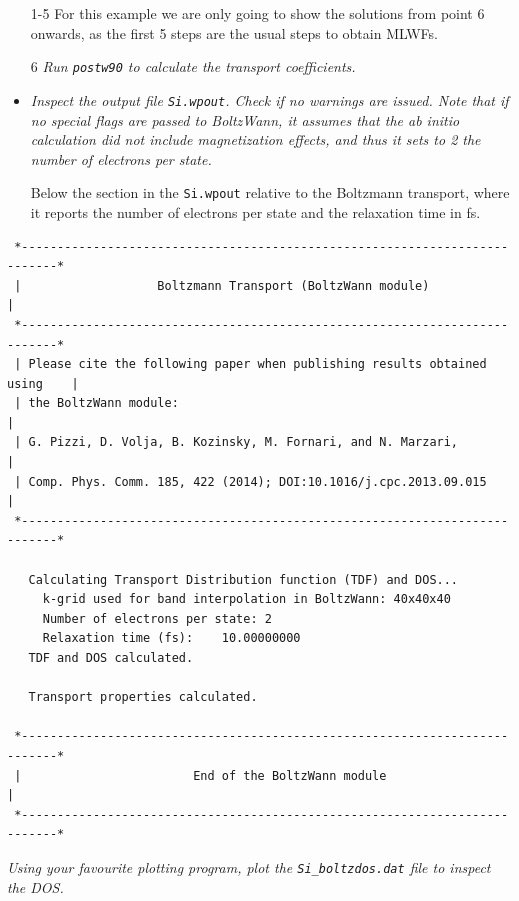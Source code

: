 \begin{itemize}
	\item[1-5] For this example we are only going to show the solutions from point 6 onwards, as the first 5 steps are the usual steps to obtain MLWFs.
	\item[6] {\it Run {\tt postw90} to calculate the transport coefficients.}
	\item {\it Inspect the output file {\tt Si.wpout}. Check if no warnings are issued. Note that if no special flags are passed to {\sc BoltzWann}, it assumes that the {\it ab initio} calculation did not include magnetization effects, and thus it sets to 2 the number of electrons per state.}

Below the section in the {\tt Si.wpout} relative to the Boltzmann transport, where it reports the number of electrons per state and the relaxation time in fs.
\end{itemize}
\begin{tcolorbox}[sharp corners,boxrule=0.5pt]
{\small
\begin{verbatim}
 *---------------------------------------------------------------------------*
 |                   Boltzmann Transport (BoltzWann module)                  |
 *---------------------------------------------------------------------------*
 | Please cite the following paper when publishing results obtained using    |
 | the BoltzWann module:                                                     |
 | G. Pizzi, D. Volja, B. Kozinsky, M. Fornari, and N. Marzari,              |
 | Comp. Phys. Comm. 185, 422 (2014); DOI:10.1016/j.cpc.2013.09.015          |
 *---------------------------------------------------------------------------*

   Calculating Transport Distribution function (TDF) and DOS...
     k-grid used for band interpolation in BoltzWann: 40x40x40
     Number of electrons per state: 2
     Relaxation time (fs):    10.00000000     
   TDF and DOS calculated.

   Transport properties calculated.

 *---------------------------------------------------------------------------*
 |                        End of the BoltzWann module                        |
 *---------------------------------------------------------------------------*
\end{verbatim}
}
\end{tcolorbox}  


{\it Using your favourite plotting program, plot the {\tt Si\_boltzdos.dat} file to inspect the DOS.}


